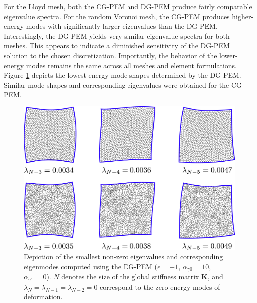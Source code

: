 For the Lloyd mesh, both the CG-PEM and DG-PEM produce fairly comparable eigenvalue spectra. For the random Voronoi mesh, the CG-PEM produces higher-energy modes with significantly larger eigenvalues than the DG-PEM. Interestingly, the DG-PEM yields very similar eigenvalue spectra for both meshes. This appears to indicate a diminished sensitivity of the DG-PEM solution to the chosen discretization. Importantly, the behavior of the lower-energy modes remains the same across all meshes and element formulations. Figure \ref{fig:patch_eigenmodes_DGPEM} depicts the lowest-energy mode shapes determined by the DG-PEM. Similar mode shapes and corresponding eigenvalues were obtained for the CG-PEM.
\begin{figure}[!h]
  \centering
  \includegraphics[width=5.0in]{figures/patch_eigenmodes_DGPEM.pdf}  \caption{Depiction of the smallest non-zero eigenvalues and corresponding eigenmodes computed using the DG-PEM ($\epsilon = +1$, $\alpha_{\gamma0} = 10$, $\alpha_{\gamma1} = 0$). $N$ denotes the size of the global stiffness matrix $\mathbf{K}$, and $\lambda_{N} = \lambda_{N-1} = \lambda_{N-2} = 0$ correspond to the zero-energy modes of deformation.}
  \label{fig:patch_eigenmodes_DGPEM}
\end{figure}

